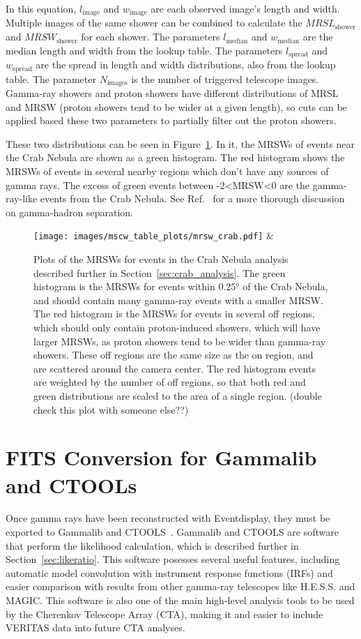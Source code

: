 In this equation, $l_{\textrm{image}}$ and $w_{\textrm{image}}$ are each observed image's length and width.
Multiple images of the same shower can be combined to calculate the $MRSL_{\textrm{shower}}$ and $MRSW_{\textrm{shower}}$ for each shower.
The parameters $l_{\textrm{median}}$ and $w_{\textrm{median}}$ are the median length and width from the lookup table.
The parameters $l_{\textrm{spread}}$ and $w_{\textrm{spread}}$ are the spread in length and width distributions, also from the lookup table.
The parameter $N_{\textrm{images}}$ is the number of triggered telescope images.
Gamma-ray showers and proton showers have different distributions of MRSL and MRSW (proton showers tend to be wider at a given length), so cuts can be applied based these two parameters to partially filter out the proton showers.

These two distributions can be seen in Figure~\ref{fig:mscw_crab}.
In it, the MRSWs of events near the Crab Nebula are shown as a green histogram.
The red histogram shows the MRSWs of events in several nearby regions which don't have any sources of gamma rays.
The excess of green events between -2<MRSW<0 are the gamma-ray-like events from the Crab Nebula.
See Ref.~\cite{Krause2017} for a more thorough discussion on gamma-hadron separation.

\begin{figure}[th]
  \centering
  \texttt{[image: images/mscw\_table\_plots/mrsw\_crab.pdf]} &
  \caption[Crab Nebula Mean Reduced Scaled Width]{
    Plots of the MRSWs for events in the Crab Nebula analysis described further in Section~\ref{sec:crab_analysis}.
    The green histogram is the MRSWs for events within \ang{0.25} of the Crab Nebula, and should contain many gamma-ray events with a smaller MRSW.
    The red histogram is the MRSWs for events in several off regions, which should only contain proton-induced showers, which will have larger MRSWs, as proton showers tend to be wider than gamma-ray showers.
    These off regions are the same size as the on region, and are scattered around the camera center.
    The red histogram events are weighted by the number of off regions, so that both red and green distributions are scaled to the area of a single region.
    {\color{red}(double check this plot with someone else??)}
  }
  \label{fig:mscw_crab}
\end{figure}


\section{FITS Conversion for Gammalib and CTOOLs}\label{fitsconversion}
Once gamma rays have been reconstructed with Eventdisplay, they must be exported to Gammalib and CTOOLS~\cite{gammalibctools}.
Gammalib and CTOOLS are software that perform the likelihood calculation, which is described further in Section~\ref{sec:likeratio}.
This software posesses several useful features, including automatic model convolution with instrument response functions (IRFs) and easier comparison with results from other gamma-ray telescopes like H.E.S.S. and MAGIC.
This software is also one of the main high-level analysis tools to be used by the Cherenkov Telescope Array (CTA), making it and easier to include VERITAS data into future CTA analyses.

